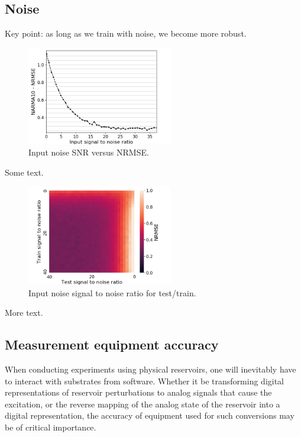 
\subsection{Noise}

Key point: as long as we train with noise, we become more robust.

\begin{figure}[H]
  \centering
  \includegraphics[width=2.5in]{img/input_noise_snr.png}
  \caption{
    Input noise SNR versus NRMSE.
  }
  \label{input_noise_snr}
\end{figure}

Some text.

\begin{figure}[H]
  \centering
  \includegraphics[width=2.5in]{img/input_noise_heatmap.png}
  \caption{
    Input noise signal to noise ratio for test/train.
  }
  \label{input_noise_heatmap}
\end{figure}

More text.

\subsection{Measurement equipment accuracy}

When conducting experiments using physical reservoirs, one will inevitably have
to interact with substrates from software. Whether it be transforming digital
representations of reservoir perturbations to analog signals that cause the
excitation, or the reverse mapping of the analog state of the reservoir into a
digital representation, the accuracy of equipment used for such conversions may
be of critical importance.


